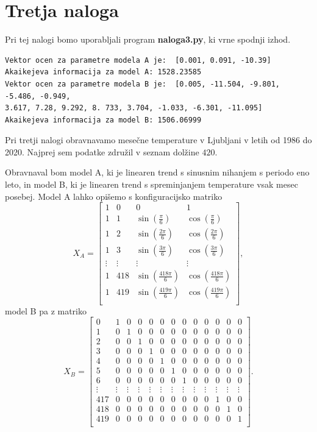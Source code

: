 \documentclass{article}
\begin{document}
\section{Tretja naloga}

Pri tej nalogi bomo uporabljali program \textbf{naloga3.py}, ki vrne spodnji
izhod.
\begin{verbatim}
Vektor ocen za parametre modela A je:  [0.001, 0.091, -10.39]
Akaikejeva informacija za model A: 1528.23585
Vektor ocen za parametre modela B je:  [0.005, -11.504, -9.801, -5.486, -0.949,
3.617, 7.28, 9.292, 8. 733, 3.704, -1.033, -6.301, -11.095]
Akaikejeva informacija za model B: 1506.06999
\end{verbatim}

Pri tretji nalogi obravnavamo mesečne temperature v Ljubljani v letih od 1986 do
2020. Najprej sem podatke združil v seznam dolžine $420$.

Obravnaval bom model A, ki je linearen trend s sinusnim nihanjem s periodo eno
leto, in model B, ki je linearen trend s spreminjanjem temperature vsak mesec
posebej. Model A lahko opišemo s konfiguracijsko matriko
\[
    X_A =
    \left[ {\begin{array}{cccc}
        1 & 0 & 0 & 1\\
        1 & 1 & \sin(\frac{\pi}{6}) & \cos(\frac{\pi}{6})\\
        1 & 2 & \sin(\frac{2 \pi}{6}) & \cos(\frac{2 \pi}{6})\\
        1 & 3 & \sin(\frac{3 \pi}{6}) & \cos(\frac{3 \pi}{6})\\
        \vdots & \vdots & \vdots & \vdots\\
        1 & 418 & \sin(\frac{418 \pi}{6}) & \cos(\frac{418 \pi}{6})\\
        1 & 419 & \sin(\frac{419 \pi}{6}) & \cos(\frac{419 \pi}{6})\\
    \end{array} } \right],
\]
model B pa z matriko
\[
    X_B =
    \left[ {\begin{array}{ccccccccccccc}
        0 & 1 & 0 & 0 & 0 & 0 & 0 & 0 & 0 & 0 & 0 & 0 & 0\\
        1 & 0 & 1 & 0 & 0 & 0 & 0 & 0 & 0 & 0 & 0 & 0 & 0\\
        2 & 0 & 0 & 1 & 0 & 0 & 0 & 0 & 0 & 0 & 0 & 0 & 0\\
        3 & 0 & 0 & 0 & 1 & 0 & 0 & 0 & 0 & 0 & 0 & 0 & 0\\
        4 & 0 & 0 & 0 & 0 & 1 & 0 & 0 & 0 & 0 & 0 & 0 & 0\\
        5 & 0 & 0 & 0 & 0 & 0 & 1 & 0 & 0 & 0 & 0 & 0 & 0\\
        6 & 0 & 0 & 0 & 0 & 0 & 0 & 1 & 0 & 0 & 0 & 0 & 0\\
        \vdots & \vdots & \vdots & \vdots & \vdots & \vdots & \vdots & \vdots &
        \vdots & \vdots & \vdots & \vdots & \vdots\\
        417 & 0 & 0 & 0 & 0 & 0 & 0 & 0 & 0 & 0 & 1 & 0 & 0\\
        418 & 0 & 0 & 0 & 0 & 0 & 0 & 0 & 0 & 0 & 0 & 1 & 0\\
        419 & 0 & 0 & 0 & 0 & 0 & 0 & 0 & 0 & 0 & 0 & 0 & 1\\
    \end{array} } \right].
\]
\end{document}
